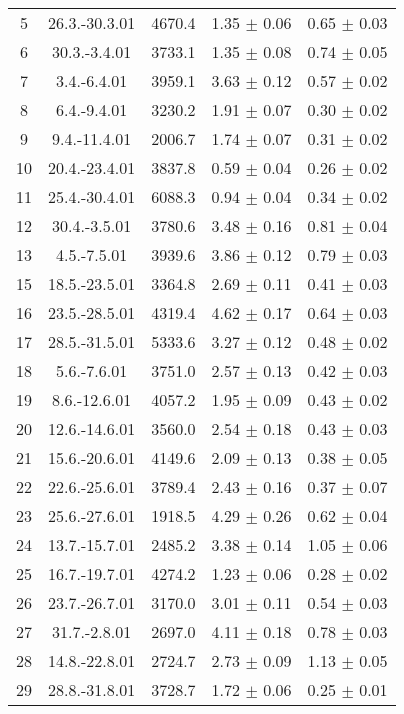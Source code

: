 \documentclass[a4paper,12pt]{article}
\begin{document}
\begin{center}
\begin{longtable}{|c|c|c|c|c|}
    5	&	26.3.-30.3.01	&	4670.4	&	1.35 $\pm$ 0.06	&	0.65 $\pm$ 0.03	\\
    6	&	30.3.-3.4.01	&	3733.1	&	1.35 $\pm$ 0.08	&	0.74 $\pm$ 0.05	\\
    7	&	3.4.-6.4.01	&	3959.1	&	3.63 $\pm$ 0.12	&	0.57 $\pm$ 0.02	\\
    8	&	6.4.-9.4.01	&	3230.2	&	1.91 $\pm$ 0.07	&	0.30 $\pm$ 0.02	\\
    9	&	9.4.-11.4.01	&	2006.7	&	1.74 $\pm$ 0.07	&	0.31 $\pm$ 0.02	\\
    10	&	20.4.-23.4.01	&	3837.8	&	0.59 $\pm$ 0.04	&	0.26 $\pm$ 0.02	\\
    11	&	25.4.-30.4.01	&	6088.3	&	0.94 $\pm$ 0.04	&	0.34 $\pm$ 0.02	\\
    12	&	30.4.-3.5.01	&	3780.6	&	3.48 $\pm$ 0.16	&	0.81 $\pm$ 0.04	\\
    13	&	4.5.-7.5.01	&	3939.6	&	3.86 $\pm$ 0.12	&	0.79 $\pm$ 0.03	\\
    15	&	18.5.-23.5.01	&	3364.8	&	2.69 $\pm$ 0.11	&	0.41 $\pm$ 0.03	\\
    16	&	23.5.-28.5.01	&	4319.4	&	4.62 $\pm$ 0.17	&	0.64 $\pm$ 0.03	\\
    17	&	28.5.-31.5.01	&	5333.6	&	3.27 $\pm$ 0.12	&	0.48 $\pm$ 0.02	\\
    18	&	5.6.-7.6.01	&	3751.0	&	2.57 $\pm$ 0.13	&	0.42 $\pm$ 0.03	\\
    19	&	8.6.-12.6.01	&	4057.2	&	1.95 $\pm$ 0.09	&	0.43 $\pm$ 0.02	\\
    20	&	12.6.-14.6.01	&	3560.0	&	2.54 $\pm$ 0.18	&	0.43 $\pm$ 0.03	\\
    21	&	15.6.-20.6.01	&	4149.6	&	2.09 $\pm$ 0.13	&	0.38 $\pm$ 0.05	\\
    22	&	22.6.-25.6.01	&	3789.4	&	2.43 $\pm$ 0.16	&	0.37 $\pm$ 0.07	\\
    23	&	25.6.-27.6.01	&	1918.5	&	4.29 $\pm$ 0.26	&	0.62 $\pm$ 0.04	\\
    24	&	13.7.-15.7.01	&	2485.2	&	3.38 $\pm$ 0.14	&	1.05 $\pm$ 0.06	\\
    25	&	16.7.-19.7.01	&	4274.2	&	1.23 $\pm$ 0.06	&	0.28 $\pm$ 0.02	\\
    26	&	23.7.-26.7.01	&	3170.0	&	3.01 $\pm$ 0.11	&	0.54 $\pm$ 0.03	\\
    27	&	31.7.-2.8.01	&	2697.0	&	4.11 $\pm$ 0.18	&	0.78 $\pm$ 0.03	\\
    28	&	14.8.-22.8.01	&	2724.7	&	2.73 $\pm$ 0.09	&	1.13 $\pm$ 0.05	\\
    29	&	28.8.-31.8.01	&	3728.7	&	1.72 $\pm$ 0.06	&	0.25 $\pm$ 0.01	\\

\end{longtable}
\end{center}
\end{document}
